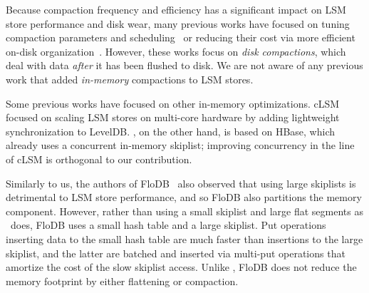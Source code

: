 





Because compaction frequency and efficiency has a significant impact on LSM store performance and disk wear, 
many previous works have focused on tuning compaction parameters and scheduling~\cite{hbasetuning,rocksdb,
scylladbcompaction,universalcompaction,Sears:2012} or reducing their cost via more efficient on-disk organization~\cite{wisckey}. 
However, these works focus on \emph{disk compactions},
which deal with data \emph{after} it has been flushed to disk. We are not aware of any previous work that 
added \emph{in-memory} compactions to LSM stores.

Some previous works have focused on other in-memory optimizations. 
cLSM~\cite{clsm} focused on scaling LSM stores on multi-core hardware by adding lightweight synchronization to LevelDB. 
\sys, on the other hand, is based on HBase, which already uses a concurrent in-memory skiplist; improving concurrency
in the line of cLSM is orthogonal to our contribution.  


Similarly to us, the authors of FloDB~\cite{flodb} also observed that using large skiplists is detrimental to 
LSM store performance, and so FloDB also partitions the memory component. However, rather than using 
a small skiplist and large flat segments as \sys\ does, FloDB  uses a small hash table and a large skiplist.
Put operations inserting data to the small hash table are much faster than insertions to the large skiplist, 
and the latter are batched and inserted via multi-put operations that amortize the cost of the slow skiplist access.
Unlike \sys, FloDB does not reduce the memory footprint by either flattening or compaction. 

